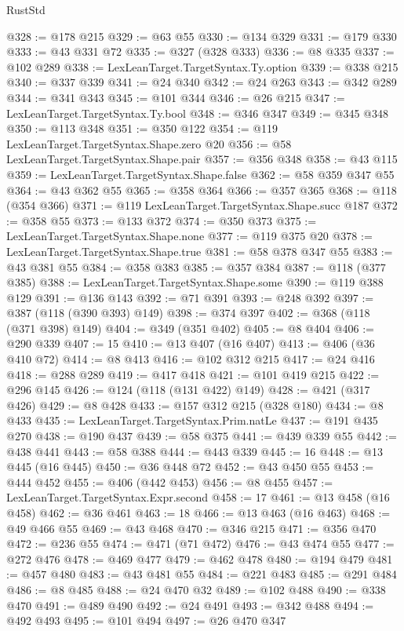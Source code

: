 \begin{lexlean}{RustStd}
\begin{coremodule}
@328 := @178 @215
@329 := @63 @55
@330 := @134 @329
@331 := @179 @330
@333 := @43 @331 @72
@335 := @327 (@328 @333)
@336 := @8 @335
@337 := @102 @289
@338 := LexLeanTarget.TargetSyntax.Ty.option
@339 := @338 @215
@340 := @337 @339
@341 := @24 @340
@342 := @24 @263
@343 := @342 @289
@344 := @341 @343
@345 := @101 @344
@346 := @26 @215
@347 := LexLeanTarget.TargetSyntax.Ty.bool
@348 := @346 @347
@349 := @345 @348
@350 := @113 @348
@351 := @350 @122
@354 := @119 LexLeanTarget.TargetSyntax.Shape.zero @20
@356 := @58 LexLeanTarget.TargetSyntax.Shape.pair
@357 := @356 @348
@358 := @43 @115
@359 := LexLeanTarget.TargetSyntax.Shape.false
@362 := @58 @359 @347 @55
@364 := @43 @362 @55
@365 := @358 @364
@366 := @357 @365
@368 := @118 (@354 @366)
@371 := @119 LexLeanTarget.TargetSyntax.Shape.succ @187
@372 := @358 @55
@373 := @133 @372
@374 := @350 @373
@375 := LexLeanTarget.TargetSyntax.Shape.none
@377 := @119 @375 @20
@378 := LexLeanTarget.TargetSyntax.Shape.true
@381 := @58 @378 @347 @55
@383 := @43 @381 @55
@384 := @358 @383
@385 := @357 @384
@387 := @118 (@377 @385)
@388 := LexLeanTarget.TargetSyntax.Shape.some
@390 := @119 @388 @129
@391 := @136 @143
@392 := @71 @391
@393 := @248 @392
@397 := @387 (@118 (@390 @393) @149)
@398 := @374 @397
@402 := @368 (@118 (@371 @398) @149)
@404 := @349 (@351 @402)
@405 := @8 @404
@406 := @290 @339
@407 := 15
@410 := @13 @407 (@16 @407)
@413 := @406 (@36 @410 @72)
@414 := @8 @413
@416 := @102 @312 @215
@417 := @24 @416
@418 := @288 @289
@419 := @417 @418
@421 := @101 @419 @215
@422 := @296 @145
@426 := @124 (@118 (@131 @422) @149)
@428 := @421 (@317 @426)
@429 := @8 @428
@433 := @157 @312 @215 (@328 @180)
@434 := @8 @433
@435 := LexLeanTarget.TargetSyntax.Prim.natLe
@437 := @191 @435 @270
@438 := @190 @437
@439 := @58 @375
@441 := @439 @339 @55
@442 := @438 @441
@443 := @58 @388
@444 := @443 @339
@445 := 16
@448 := @13 @445 (@16 @445)
@450 := @36 @448 @72
@452 := @43 @450 @55
@453 := @444 @452
@455 := @406 (@442 @453)
@456 := @8 @455
@457 := LexLeanTarget.TargetSyntax.Expr.second
@458 := 17
@461 := @13 @458 (@16 @458)
@462 := @36 @461
@463 := 18
@466 := @13 @463 (@16 @463)
@468 := @49 @466 @55
@469 := @43 @468
@470 := @346 @215
@471 := @356 @470
@472 := @236 @55
@474 := @471 (@71 @472)
@476 := @43 @474 @55
@477 := @272 @476
@478 := @469 @477
@479 := @462 @478
@480 := @194 @479
@481 := @457 @480
@483 := @43 @481 @55
@484 := @221 @483
@485 := @291 @484
@486 := @8 @485
@488 := @24 @470 @32
@489 := @102 @488
@490 := @338 @470
@491 := @489 @490
@492 := @24 @491
@493 := @342 @488
@494 := @492 @493
@495 := @101 @494
@497 := @26 @470 @347

\end{coremodule}
\end{lexlean}
